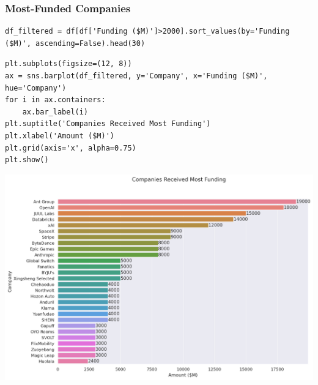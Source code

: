 \documentclass[a4paper,12pt]{article}
\begin{document}
\subsubsection{Most-Funded Companies}
\label{sec:org37f6dfc}

\begin{verbatim}
df_filtered = df[df['Funding ($M)']>2000].sort_values(by='Funding ($M)', ascending=False).head(30)
\end{verbatim}

\begin{verbatim}
plt.subplots(figsize=(12, 8))
ax = sns.barplot(df_filtered, y='Company', x='Funding ($M)', hue='Company')
for i in ax.containers:
    ax.bar_label(i)
plt.suptitle('Companies Received Most Funding')
plt.xlabel('Amount ($M)')
plt.grid(axis='x', alpha=0.75)
plt.show()
\end{verbatim}

\begin{center}
\includegraphics[width=.9\linewidth]{./.ob-jupyter/fb1eb3db2c42a7fcca21bbc7173378d3b82bc0f4.png}
\label{}
\end{center}
\end{document}
